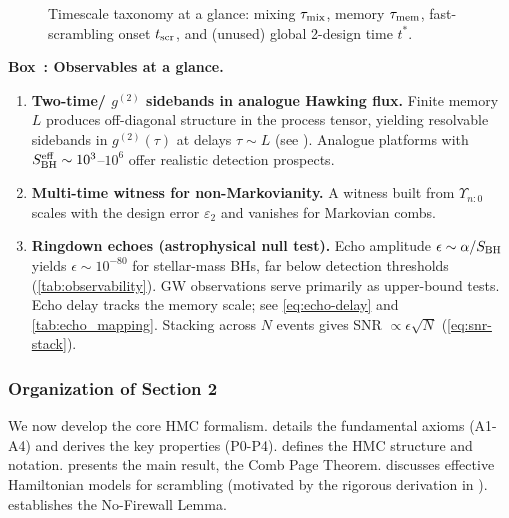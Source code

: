 \documentclass[aps,prd,preprint,onecolumn,superscriptaddress,nofootinbib,longbibliography,floatfix,11pt,showpacs,showkeys]{revtex4-2}
\newcommand{\gII}{g^{(2)}}
\newcommand{\HMC}{\textsc{HMC}\xspace}
\newcounter{boxedresult}
\newenvironment{boxedresult}[1]{\refstepcounter{boxedresult}\begin{infobox}\noindent\textbf{Box~\theboxedresult: #1.}}{\end{infobox}}
\theoremstyle{plain}
\theoremstyle{definition}
\theoremstyle{remark}
\begin{document}
\begin{figure}[t]
  \centering
  \vspace{-1ex}
  \caption{Timescale taxonomy at a glance: mixing $\tau_{\rm mix}$, memory $\tau_{\rm mem}$,
  fast-scrambling onset $t_{\rm scr}$, and (unused) global 2-design time $t^*$.}
  \label{fig:timeline}
\end{figure}

\begin{boxedresult}{Observables at a glance}
\begin{enumerate}[leftmargin=*]
\item \textbf{Two-time/ \(\gII\) sidebands in analogue Hawking flux.} Finite memory \(L\) produces off-diagonal structure in the process tensor, yielding resolvable sidebands in \(\gII(\tau)\) at delays \(\tau\sim L\) (see ). Analogue platforms with $S_{\rm BH}^{\rm eff}\sim 10^3$--$10^6$ offer realistic detection prospects.
\item \textbf{Multi-time witness for non-Markovianity.} A witness built from \(\Upsilon_{n{:}0}\) scales with the design error \(\varepsilon_2\) and vanishes for Markovian combs.
\item \textbf{Ringdown echoes (astrophysical null test).} Echo amplitude $\epsilon\sim \alpha/S_{\rm BH}$ yields $\epsilon\sim 10^{-80}$ for stellar-mass BHs, far below detection thresholds (\cref{tab:observability}). GW observations serve primarily as upper-bound tests. Echo delay tracks the memory scale; see \eqref{eq:echo-delay} and \cref{tab:echo_mapping}. Stacking across \(N\) events gives SNR \(\propto \epsilon \sqrt{N}\) (\eqref{eq:snr-stack}).
\end{enumerate}
\end{boxedresult}

\subsubsection{Organization of Section 2}
We now develop the core \HMC{} formalism.
 details the fundamental axioms (A1-A4) and derives the key properties (P0-P4).
 defines the \HMC{} structure and notation.
 presents the main result, the Comb Page Theorem.
 discusses effective Hamiltonian models for scrambling (motivated by the rigorous derivation in ).
 establishes the No-Firewall Lemma.
\end{document}
